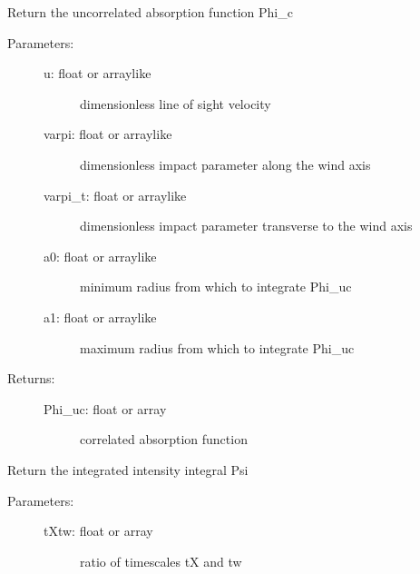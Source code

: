\documentclass[letterpaper,10pt,english]{sphinxmanual}
\begin{document}
\begin{fulllineitems}
\begin{fulllineitems}
\begin{description}
\end{description}

\end{fulllineitems}


\begin{fulllineitems}
\label{fulldoc:despotic.winds.pwind.Phi_uc}
Return the uncorrelated absorption function Phi\_c
\begin{description}
\item[{Parameters:}] \leavevmode\begin{description}
\item[{u: float or arraylike}] \leavevmode
dimensionless line of sight velocity

\item[{varpi: float or arraylike}] \leavevmode
dimensionless impact parameter along the wind axis

\item[{varpi\_t: float or arraylike}] \leavevmode
dimensionless impact parameter transverse to the wind
axis

\item[{a0: float or arraylike}] \leavevmode
minimum radius from which to integrate Phi\_uc

\item[{a1: float or arraylike}] \leavevmode
maximum radius from which to integrate Phi\_uc

\end{description}

\item[{Returns:}] \leavevmode\begin{description}
\item[{Phi\_uc: float or array}] \leavevmode
correlated absorption function

\end{description}

\end{description}

\end{fulllineitems}


\begin{fulllineitems}
\label{fulldoc:despotic.winds.pwind.Psi}
Return the integrated intensity integral Psi
\begin{description}
\item[{Parameters:}] \leavevmode\begin{description}
\item[{tXtw: float or array}] \leavevmode
ratio of timescales tX and tw


\end{description}
\end{description}
\end{fulllineitems}
\end{fulllineitems}
\end{document}
